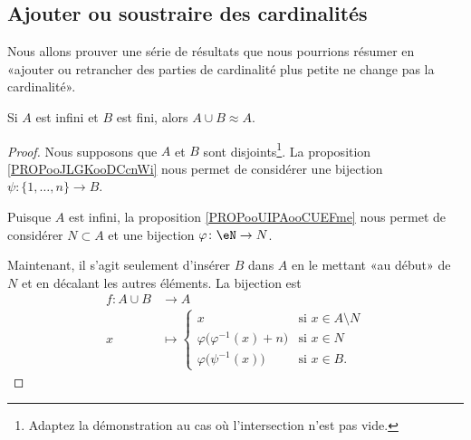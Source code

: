 \subsection{Ajouter ou soustraire des cardinalités}
\label{SUBooOperationsCardinaux}

\begin{normaltext}	\label{NORMooOperationsCardinaux}
	Nous allons prouver une série de résultats que nous pourrions résumer en  «ajouter ou retrancher des parties de cardinalité plus petite ne change pas la cardinalité».
\end{normaltext}

\begin{lemma}        \label{LEMooUFCAooSyZtZj}
	Si \( A\) est infini et \( B\) est fini, alors \( A\cup B\approx A\).
\end{lemma}

\begin{proof}
	Nous supposons que \( A\) et \( B\) sont disjoints\footnote{Adaptez la démonstration au cas où l'intersection n'est pas vide.}. La proposition \ref{PROPooJLGKooDCcnWi} nous permet de considérer une bijection \( \psi\colon \{ 1,\ldots, n \}\to B\).

	Puisque \( A\) est infini, la proposition \ref{PROPooUIPAooCUEFme} nous permet de considérer \( N\subset A\) et une bijection \( \varphi\colon \eN\to N\).

	Maintenant, il s'agit seulement d'insérer \( B\) dans \( A\) en le mettant «au début» de \( N\) et en décalant les autres éléments. La bijection est
	\begin{equation}
		\begin{aligned}
			f\colon A\cup B & \to A                                                                                  \\
			x               & \mapsto \begin{cases}
				                          x                                    & \text{si } x\in A\setminus N \\
				                          \varphi\big( \varphi^{-1}(x)+n \big) & \text{si } x\in N            \\
				                          \varphi\big( \psi^{-1}(x) \big)      & \text{si }x\in B.
			                          \end{cases}
		\end{aligned}
	\end{equation}
\end{proof}

